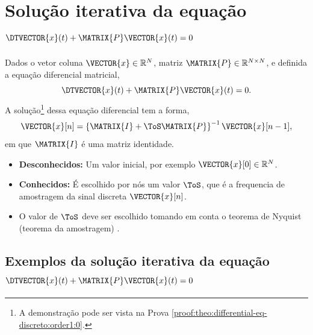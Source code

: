 \section{ Solução iterativa da equação $\DTVECTOR{x}(t) + \MATRIX{P} \VECTOR{x}(t)=0$ }

\begin{theorem}[Equação 
$\DTVECTOR{x}(t) + \MATRIX{P} \VECTOR{x}(t)=0$ com diferenças regressivas:]
\label{theo:differential-eq-discreto:order1:0}
Dados o vetor coluna $\VECTOR{x} \in \mathbb{R}^N$, matriz $\MATRIX{P} \in \mathbb{R}^{N\times N}$, 
e definida a equação diferencial matricial,
\begin{equation}
\DTVECTOR{x}(t) + \MATRIX{P} \VECTOR{x}(t)=0.
\end{equation}
A solução\footnote{A
demonstração pode ser vista na Prova \ref{proof:theo:differential-eq-discreto:order1:0}.} dessa 
equação diferencial tem a forma,
\begin{equation}
  \VECTOR{x}[n]=\left\{\MATRIX{I} + \ToS \MATRIX{P}\right\}^{-1}\VECTOR{x}[n-1],
\end{equation}
em que $\MATRIX{I}$ é uma matriz identidade.
\begin{itemize}
\item \textbf{Desconhecidos:} Um valor inicial, por exemplo $\VECTOR{x}[0] \in \mathbb{R}^{N}$.
\item  \textbf{Conhecidos:} É escolhido por nós um valor $\ToS$, 
que é a frequencia de amostragem da sinal discreta $\VECTOR{x}[n]$.
\end{itemize}
\end{theorem}

\begin{tcbattention}
\begin{itemize}
\item O valor de $\ToS$ deve ser escolhido tomando em conta o teorema de Nyquist (teorema da amostragem) 
\cite[pp. 67]{rochol2009comunicacao} \cite[pp. 122]{forouzan2009comunicacao}.
\end{itemize}
\end{tcbattention}

\subsection{Exemplos da solução iterativa da equação $\DTVECTOR{x}(t) + \MATRIX{P} \VECTOR{x}(t)=0$}

